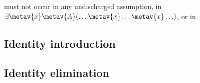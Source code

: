 \begin{multicols}{2}
\begin{fitchproof}
	\open	
	\close
\end{fitchproof}

\medskip\begin{raggedright}
\noindent {} must not occur in any undischarged assumption, in $\exists \metav{x}\metav{A}(\ldots \metav{x} \ldots \metav{x}\ldots)$, or in \end{raggedright}\vfill\columnbreak

\end{multicols}

\subsection*{Identity introduction}

\begin{fitchproof}
	 
\end{fitchproof}


\subsection*{Identity elimination}

\begin{multicols}{2}
\begin{fitchproof}
	 
\end{fitchproof}
\begin{fitchproof}
	 
\end{fitchproof}
\end{multicols}

